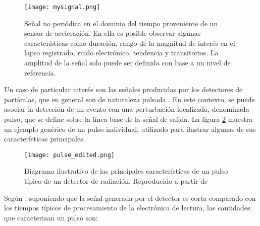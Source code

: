 \documentclass{report}
\begin{document}
\begin{figure}[H]
    \centering
    \texttt{[image: mysignal.png]}
    \caption{Señal no periódica en el dominio del tiempo proveniente de un sensor de aceleración. En ella es posible observar algunas características como duración, rango de la magnitud de interés en el lapso registrado, ruido electrónico, tendencia y transitorios. La amplitud de la señal solo puede ser definida con base a un nivel de referencia.}
    \label{fig:generic_signal}

\end{figure}

\noindent Un caso de particular interés son las señales producidas por los detectores de partículas, que en general son de naturaleza pulsada \cite{kolanoski1}. En este contexto, se puede asociar la detección de un evento con una perturbación localizada, denominada pulso, que se define sobre la línea base de la señal de salida. La figura \ref{fig:pulse} muestra un ejemplo genérico de un pulso individual, utilizado para ilustrar algunas de sus características principales.

\begin{figure}[H]
    \centering
    \texttt{[image: pulse\_edited.png]}
    \caption{Diagrama ilustrativo de las principales características de un pulso típico de un detector de radiación. Reproducido a partir de \cite{kolanoski2}}
    \label{fig:pulse}

\end{figure}

\noindent Según \cite{kolanoski2}, suponiendo que la señal generada por el detector es corta comparado con los tiempos típicos de procesamiento de la electrónica de lectura, las cantidades que caracterizan un pulso son:
\end{document}
